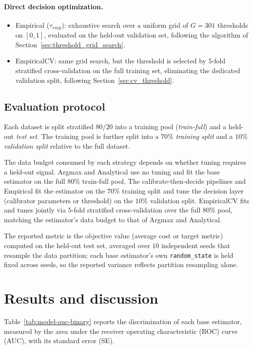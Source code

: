 \paragraph{Direct decision optimization.}
\begin{itemize}
    \item Empirical ($\tau_{emp}$): exhaustive search over a uniform grid of $G = 301$ thresholds on $[0,1]$, evaluated on the held-out validation set, following the algorithm of Section~\ref{sec:threshold_grid_search}.
    \item EmpiricalCV\@: same grid search, but the threshold is selected by $5$-fold stratified cross-validation on the full training set, eliminating the dedicated validation split, following Section~\ref{sec:cv_threshold}.
\end{itemize}

\subsection{Evaluation protocol}
Each dataset is split stratified $80/20$ into a training pool (\emph{train-full}) and a held-out \emph{test set}. The training pool is further split into a $70\%$ \emph{training split} and a $10\%$ \emph{validation split} relative to the full dataset.

The data budget consumed by each strategy depends on whether tuning requires a held-out signal. Argmax and Analytical use no tuning and fit the base estimator on the full $80\%$ train-full pool. The calibrate-then-decide pipelines and Empirical fit the estimator on the $70\%$ training split and tune the decision layer (calibrator parameters or threshold) on the $10\%$ validation split. EmpiricalCV fits and tunes jointly via $5$-fold stratified cross-validation over the full $80\%$ pool, matching the estimator's data budget to that of Argmax and Analytical.

The reported metric is the objective value (average cost or target metric) computed on the held-out test set, averaged over $10$ independent seeds that resample the data partition; each base estimator's own \texttt{random\_state} is held fixed across seeds, so the reported variance reflects partition resampling alone.

\section{Results and discussion}

Table~\ref{tab:model-auc-binary} reports the discrimination of each base estimator, measured by the area under the receiver operating characteristic (ROC) curve (AUC), with its standard error (SE).

